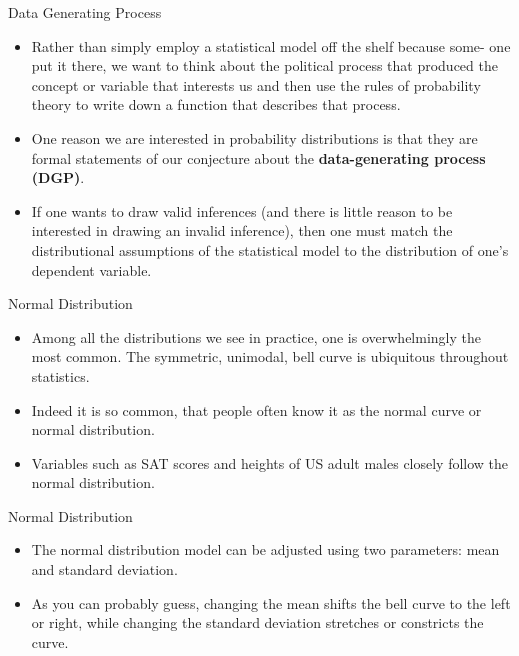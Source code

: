 \documentclass[
  ignorenonframetext,
]{beamer}
\begin{document}
\begin{frame}{Data Generating Process}
\protect\hypertarget{data-generating-process}{}

\begin{itemize}
\item
  Rather than simply employ a statistical model off the shelf because
  some- one put it there, we want to think about the political process
  that produced the concept or variable that interests us and then use
  the rules of probability theory to write down a function that
  describes that process.
\item
  One reason we are interested in probability distributions is that they
  are formal statements of our conjecture about the
  \textbf{data-generating process (DGP)}.
\item
  If one wants to draw valid inferences (and there is little reason to
  be interested in drawing an invalid inference), then one must match
  the distributional assumptions of the statistical model to the
  distribution of one's dependent variable.
\end{itemize}

\end{frame}

\begin{frame}{Normal Distribution}
\protect\hypertarget{normal-distribution}{}

\begin{itemize}
\item
  Among all the distributions we see in practice, one is overwhelmingly
  the most common. The symmetric, unimodal, bell curve is ubiquitous
  throughout statistics.
\item
  Indeed it is so common, that people often know it as the normal curve
  or normal distribution.
\item
  Variables such as SAT scores and heights of US adult males closely
  follow the normal distribution.
\end{itemize}

\end{frame}

\begin{frame}{Normal Distribution}
\protect\hypertarget{normal-distribution-1}{}

\begin{itemize}
\item
  The normal distribution model can be adjusted using two parameters:
  mean and standard deviation.
\item
  As you can probably guess, changing the mean shifts the bell curve to
  the left or right, while changing the standard deviation stretches or
  constricts the curve.
\end{itemize}

\end{frame}
\end{document}
